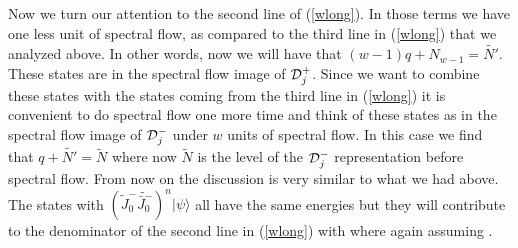 Now we turn our attention to the second  line of (\ref{wlong}).
In those terms we have one less unit of spectral flow, as compared to 
the third line in (\ref{wlong}) that we analyzed above. 
In other words, now we will have that
$ (w-1) q + N_{w-1} = \tilde {N'} $.
These states are in the spectral flow image of ${\cal D}_j^+$. 
Since we want to combine these states  with the states  coming from the 
third line in (\ref{wlong}) it is convenient to do spectral
flow one more time and think of these states as in the spectral flow
image of ${\cal D}_j^-$ under $w$ units of spectral flow. In this 
case we find that $ q + \tilde {N'} = \tilde N $ where now 
$ \tilde N $ is the level of the ${\cal D}_j^-$ representation before
spectral flow. From now on the discussion is very similar to what we
had above. The states with $ ({\tilde J}_0^- \tilde{{\bar J}_0^-} )^n 
|\psi \rangle $ all have the same energies but they will contribute to the
denominator of the second line in (\ref{wlong}) with 
where 
again assuming \assumption .
%


